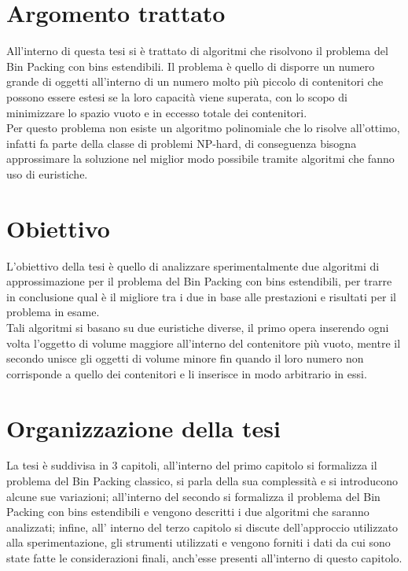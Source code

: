 {}
\section*{Argomento trattato}
All'interno di questa tesi si è trattato di algoritmi che risolvono il problema del Bin Packing con 
bins estendibili. Il problema è quello di disporre un numero grande di oggetti all'interno di 
un numero molto più piccolo di contenitori che possono essere estesi se la loro capacità viene superata, con lo scopo 
di minimizzare lo spazio vuoto e in eccesso totale dei contenitori. \\
Per questo problema non esiste un algoritmo polinomiale che lo risolve all'ottimo, infatti fa parte della
classe di problemi NP-hard, di conseguenza bisogna approssimare la soluzione nel miglior modo
possibile tramite algoritmi che fanno uso di euristiche.

{}
\section*{Obiettivo}
L'obiettivo della tesi è quello di analizzare sperimentalmente due algoritmi di approssimazione 
per il problema del Bin Packing con bins estendibili, per trarre in conclusione qual è il migliore tra i due 
in base alle prestazioni e risultati per il problema in esame. \\
Tali algoritmi si basano su due euristiche diverse, il primo opera inserendo ogni volta l'oggetto di volume 
maggiore all'interno del contenitore più vuoto, mentre il secondo unisce gli oggetti di volume minore 
fin quando il loro numero non corrisponde a quello dei contenitori e li inserisce in modo arbitrario in essi.

{}
\section*{Organizzazione della tesi}
La tesi è suddivisa in 3 capitoli, all'interno del primo capitolo si formalizza il problema del Bin Packing
classico, si parla della sua complessità e si introducono alcune sue variazioni; all'interno del secondo si formalizza
il problema del Bin Packing con bins estendibili e vengono descritti i due algoritmi che saranno analizzati; infine, all'
interno del terzo capitolo si discute dell'approccio utilizzato alla sperimentazione, gli strumenti utilizzati e vengono forniti i dati
da cui sono state fatte le considerazioni finali, anch'esse presenti all'interno di questo capitolo.
